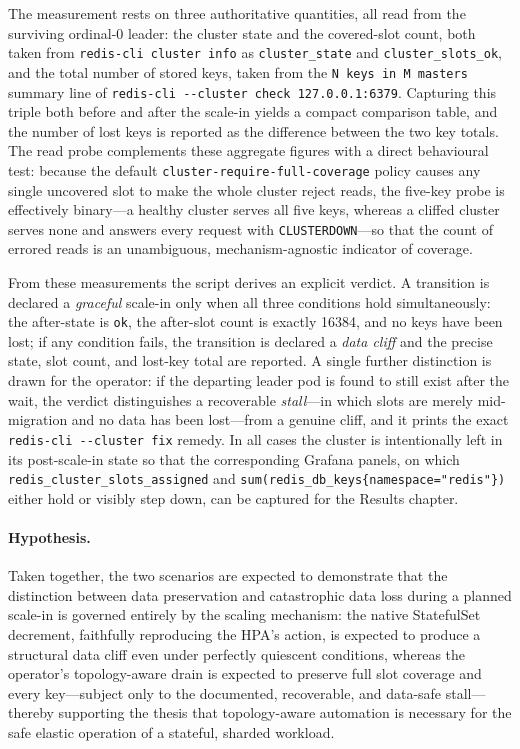 The measurement rests on three authoritative quantities, all read from the surviving
ordinal-$0$ leader: the cluster state and the covered-slot count, both taken from
\texttt{redis-cli cluster info} as \texttt{cluster\_state} and \texttt{cluster\_slots\_ok},
and the total number of stored keys, taken from the \texttt{N keys in M masters} summary line
of \texttt{redis-cli -{}-cluster check 127.0.0.1:6379}. Capturing this triple both before and
after the scale-in yields a compact comparison table, and the number of lost keys is reported
as the difference between the two key totals. The read probe complements these aggregate
figures with a direct behavioural test: because the default
\texttt{cluster-require-full-coverage} policy causes any single uncovered slot to make the
whole cluster reject reads, the five-key probe is effectively binary---a healthy cluster
serves all five keys, whereas a cliffed cluster serves none and answers every request with
\texttt{CLUSTERDOWN}---so that the count of errored reads is an unambiguous, mechanism-agnostic
indicator of coverage.

From these measurements the script derives an explicit verdict. A transition is declared a
\emph{graceful} scale-in only when all three conditions hold simultaneously: the after-state
is \texttt{ok}, the after-slot count is exactly \num{16384}, and no keys have been lost; if
any condition fails, the transition is declared a \emph{data cliff} and the precise
state, slot count, and lost-key total are reported. A single further distinction is drawn for
the operator: if the departing leader pod is found to still exist after the wait, the verdict
distinguishes a recoverable \emph{stall}---in which slots are merely mid-migration and no data
has been lost---from a genuine cliff, and it prints the exact \texttt{redis-cli -{}-cluster fix}
remedy. In all cases the cluster is intentionally left in its post-scale-in state so that the
corresponding Grafana panels, on which \texttt{redis\_cluster\_slots\_assigned} and
\texttt{sum(redis\_db\_keys\{namespace="redis"\})} either hold or visibly step down, can be
captured for the Results chapter.

\paragraph{Hypothesis.} Taken together, the two scenarios are expected to demonstrate that the
distinction between data preservation and catastrophic data loss during a planned scale-in is
governed entirely by the scaling mechanism: the native StatefulSet decrement, faithfully
reproducing the HPA's action, is expected to produce a structural data cliff even under
perfectly quiescent conditions, whereas the operator's topology-aware drain is expected to
preserve full slot coverage and every key---subject only to the documented, recoverable, and
data-safe stall---thereby supporting the thesis that topology-aware automation is necessary
for the safe elastic operation of a stateful, sharded workload.
